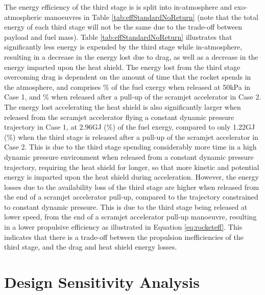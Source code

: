 The energy efficiency of the third stage is is split into in-atmosphere and exo-atmospheric manoeuvres in Table \ref{tab:effStandardNoReturn} (note that the total energy of each third stage will not be the same due to the trade-off between payload and fuel mass).
Table \ref{tab:effStandardNoReturn} illustrates that significantly less energy is expended by the third stage while in-atmosphere, resulting in a decrease in the energy lost due to drag, as well as a decrease in the energy imparted upon the heat shield. 
The energy lost from the third stage overcoming drag is dependent on the amount of time that the rocket spends in the atmosphere, and comprises \WDthreeConstqNoReturn \% of the fuel exergy when released at 50kPa in Case 1, and \WDthreeStandardNoReturn \% when released after a pull-up of the scramjet accelerator in Case 2.
The energy lost accelerating the heat shield is also significantly larger when released from the scramjet accelerator flying a constant dynamic pressure trajectory in Case 1, at 2.96GJ (\WHSthreeConstqNoReturn \%) of the fuel exergy, compared to only 1.22GJ (\WHSthreeStandardNoReturn \%) when the third stage is released after a pull-up of the scramjet accelerator in Case 2. This is due to the third stage spending considerably more time in a high dynamic pressure environment when released from a constant dynamic pressure trajectory, requiring the heat shield for longer, so that more kinetic and potential energy is imparted upon the heat shield during acceleration. However, the energy losses due to the availability loss of the third stage are higher when released from the end of a scramjet accelerator pull-up, compared to the trajectory constrained to constant dynamic pressure. This is due to the third stage being released at lower speed, from the end of a scramjet accelerator pull-up manoeuvre, resulting in a lower propulsive efficiency as illustrated in Equation \ref{eq:rocketeff}. This indicates that there is a trade-off between the propulsion inefficiencies of the third stage, and the drag and heat shield energy losses.



 

  

\section{Design Sensitivity Analysis}\label{sec:sensitivityNoReturn}

